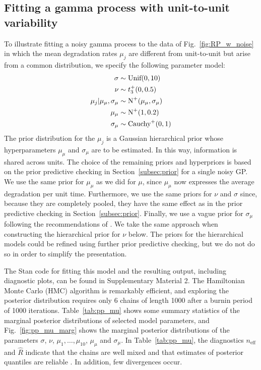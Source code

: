 \documentclass{article}
\begin{document}
\subsection{Fitting a gamma process with unit-to-unit variability}
\label{subsec:fitunitsmean}

To illustrate fitting a noisy gamma process to the data of Fig.~\ref{fig:RP_w_noise} in which the mean degradation rates $\mu_j$ are different from unit-to-unit but arise from a common distribution, we specify the following parameter model:
\begin{align*}
    \sigma & \sim \mbox{Unif}(0, 10) \\
    \nu & \sim t^{+}_3(0, 0.5) \\
    \mu_j | \mu_\mu, \sigma_\mu & \sim \hbox{N}^{+}(\mu_\mu, \sigma_\mu) \\
    \mu_\mu & \sim \mbox{N}^{+}(1, 0.2) \\
    \sigma_\mu & \sim \mbox{Cauchy}^{+}(0, 1)
\end{align*}
The prior distribution for the $\mu_j$ is a Gaussian hierarchical prior whose hyperparameters $\mu_\mu$ and $\sigma_\mu$ are to be estimated. In this way, information is shared across units. The choice of the remaining priors and hyperpriors is based on the prior predictive checking in Section~\ref{subsec:prior} for a single noisy GP. We use the same prior for $\mu_\mu$ as we did for $\mu$, since $\mu_\mu$ now expresses the average degradation per unit time. Furthermore, we use the same priors for $\nu$ and $\sigma$ since, because they are completely pooled, they have the same effect as in the prior predictive checking in Section~\ref{subsec:prior}. Finally, we use a vague prior for $\sigma_\mu$ following the recommendations of \citet[Chapter~17]{gelman_bayesian_2020}. We take the same approach when constructing the hierarchical prior for $\nu$ below. The priors for the hierarchical models could be refined using further prior predictive checking, but we do not do so in order to simplify the presentation.

The Stan code for fitting this model and the resulting output, including diagnostic plots, can be found in Supplementary Material 2. The Hamiltonian Monte Carlo (HMC) algorithm is remarkably efficient, and exploring the posterior distribution requires only 6 chains of length 1000 after a burnin period of 1000 iterations. Table~\ref{tab:pp_mu} shows some summary statistics of the marginal posterior distributions of selected model parameters, and Fig.~\ref{fig:pp_mu_marg} shows the marginal posterior distributions of the parameters $\sigma$, $\nu$, $\mu_1, \ldots, \mu_{10}$, $\mu_{\mu}$ and $\sigma_{\mu}$. In Table~\ref{tab:pp_mu}, the diagnostics $n_{\mbox{eff}}$ and $\hat{R}$ indicate that the chains are well mixed and that estimates of posterior quantiles are reliable \citep{Vehtari_2021}. In addition, few divergences occur. 
\end{document}
